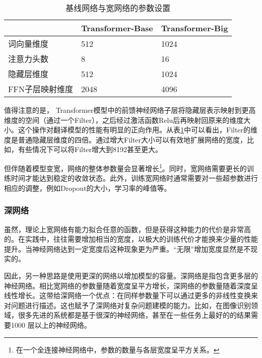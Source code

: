 \begin{table}[htp]
\centering
\caption{基线网络与宽网络的参数设置}
\begin{tabular}{ l | l l}
 & Transformer-Base &Transformer-Big \\ \hline
 \rule{0pt}{13pt} 词向量维度 & 512 &1024 \\
 \rule{0pt}{13pt} 注意力头数 &8 &16 \\
 \rule{0pt}{13pt} 隐藏层维度 &512 &1024 \\
 \rule{0pt}{13pt}  FFN子层映射维度 &2048 &4096
\end{tabular}
\label{tab:7-2}
\end{table}

\parinterval 值得注意的是， Transformer模型中的前馈神经网络子层将隐藏层表示映射到更高维度的空间（通过一个Filter），之后经过激活函数Relu后再映射回原来的维度大小。这个操作对翻译模型的性能有明显的正向作用。从表\ref{tab:7-2}中可以看出，Filter的维度是普通隐藏层维度的四倍。通过增大Filter大小可以有效地扩展网络的宽度，比如，有些情况下可以将Filter增大到8192甚至更大。

\parinterval 但伴随着模型变宽，网络的整体参数量会显著增长\footnote{在一个全连接神经网络中，参数的数量与各层宽度呈平方关系。}。同时，宽网络需要更长的训练时间才能达到稳定的收敛状态。此外，训练宽网络时通常需要对一些超参数进行相应的调整，例如Dropout的大小，学习率的峰值等。


\subsubsection{深网络}

\parinterval 虽然，理论上宽网络有能力拟合任意的函数，但是获得这种能力的代价是非常高的。在实践中，往往需要增加相当的宽度，以极大的训练代价才能换来少量的性能提升。当神经网络达到一定宽度后这种现象更为严重。``无限''增加宽度显然是不现实的。

\parinterval 因此，另一种思路是使用更深的网络以增加模型的容量。深网络是指包含更多层的神经网络。相比宽网络的参数量随着宽度呈平方增长，深网络的参数量随着深度呈线性增长。这带给深网络一个优点：在同样参数量下可以通过更多的非线性变换来对问题进行描述。这也赋予了深网络对复杂问题建模的能力。比如，在图像识别领域，很多先进的系统都是基于很深的神经网络，甚至在一些任务上最好的的结果需要1000 层以上的神经网络。

